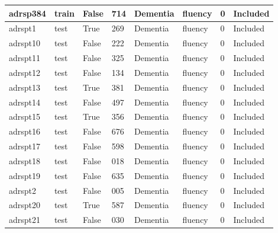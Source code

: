 \begin{center}
\begin{longtable}{|l|l|l|l|l|l|l|l|}
adrsp384       & train                 & False             & 714     & Dementia       & fluency         & 0            & Included      \\ \hline
adrspt1        & test                  & True              & 269     & Dementia       & fluency         & 0            & Included      \\ \hline
adrspt10       & test                  & False             & 222     & Dementia       & fluency         & 0            & Included      \\ \hline
adrspt11       & test                  & False             & 325     & Dementia       & fluency         & 0            & Included      \\ \hline
adrspt12       & test                  & False             & 134     & Dementia       & fluency         & 0            & Included      \\ \hline
adrspt13       & test                  & True              & 381     & Dementia       & fluency         & 0            & Included      \\ \hline
adrspt14       & test                  & False             & 497     & Dementia       & fluency         & 0            & Included      \\ \hline
adrspt15       & test                  & True              & 356     & Dementia       & fluency         & 0            & Included      \\ \hline
adrspt16       & test                  & False             & 676     & Dementia       & fluency         & 0            & Included      \\ \hline
adrspt17       & test                  & False             & 598     & Dementia       & fluency         & 0            & Included      \\ \hline
adrspt18       & test                  & False             & 018     & Dementia       & fluency         & 0            & Included      \\ \hline
adrspt19       & test                  & False             & 635     & Dementia       & fluency         & 0            & Included      \\ \hline
adrspt2        & test                  & False             & 005     & Dementia       & fluency         & 0            & Included      \\ \hline
adrspt20       & test                  & True              & 587     & Dementia       & fluency         & 0            & Included      \\ \hline
adrspt21       & test                  & False             & 030     & Dementia       & fluency         & 0            & Included      \\ \hline

\end{longtable}
\end{center}

